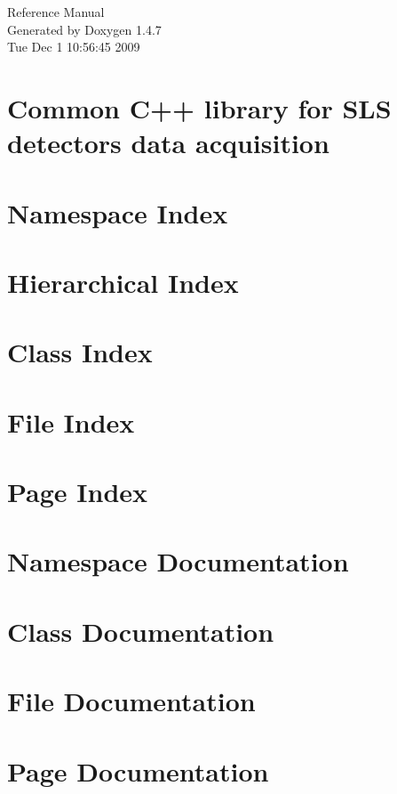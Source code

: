 \documentclass[a4paper]{book}
\begin{document}
\begin{titlepage}
\vspace*{7cm}
\begin{center}
{\Large Reference Manual}\\
\vspace*{1cm}
{\large Generated by Doxygen 1.4.7}\\
\vspace*{0.5cm}
{\small Tue Dec 1 10:56:45 2009}\\
\end{center}
\end{titlepage}
\clearemptydoublepage
{}
\tableofcontents
\clearemptydoublepage
{}
\chapter{Common C++ library for SLS detectors data acquisition }
\label{index}
\chapter{Namespace Index}

\chapter{Hierarchical Index}

\chapter{Class Index}

\chapter{File Index}

\chapter{Page Index}

\chapter{Namespace Documentation}

\chapter{Class Documentation}











\chapter{File Documentation}









\chapter{Page Documentation}

\printindex
\end{document}
